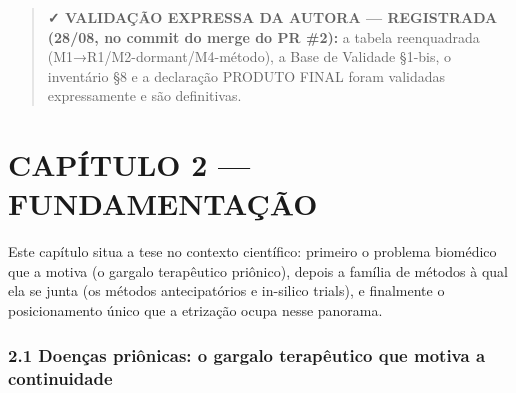 \documentclass[
  12pt,
]{report}
\begin{document}
\begin{quote}
\textbf{✓ VALIDAÇÃO EXPRESSA DA AUTORA --- REGISTRADA (28/08, no commit
do merge do PR \#2):} a tabela reenquadrada
(M1→R1/M2-dormant/M4-método), a Base de Validade §1-bis, o inventário §8
e a declaração PRODUTO FINAL foram validadas expressamente e são
definitivas.
\end{quote}

\hypertarget{capuxedtulo-2-fundamentauxe7uxe3o}{%
\chapter{CAPÍTULO 2 ---
FUNDAMENTAÇÃO}\label{capuxedtulo-2-fundamentauxe7uxe3o}}

Este capítulo situa a tese no contexto científico: primeiro o problema
biomédico que a motiva (o gargalo terapêutico priônico), depois a
família de métodos à qual ela se junta (os métodos antecipatórios e
in-silico trials), e finalmente o posicionamento único que a etrização
ocupa nesse panorama.

\hypertarget{doenuxe7as-priuxf4nicas-o-gargalo-terapuxeautico-que-motiva-a-continuidade}{%
\subsection{2.1 Doenças priônicas: o gargalo terapêutico que motiva a
continuidade}\label{doenuxe7as-priuxf4nicas-o-gargalo-terapuxeautico-que-motiva-a-continuidade}}
\end{document}
